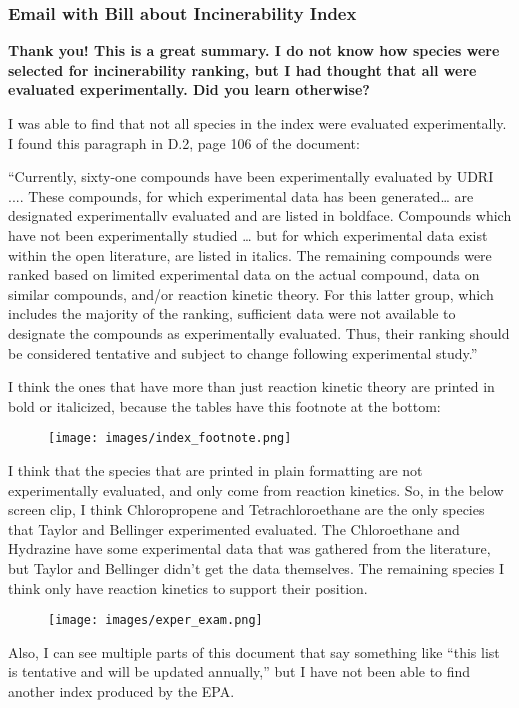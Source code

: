 \documentclass{article}
\begin{document}
\subsubsection*{Email with Bill about Incinerability Index}
\textbf{Thank you! This is a great summary.  I do not know how species were selected for incinerability ranking, but I had thought that all were evaluated experimentally.  Did you learn otherwise?}

I was able to find that not all species in the index were evaluated experimentally. I found this paragraph in D.2, page 106 of the document: 

“Currently, sixty-one compounds have been experimentally evaluated by UDRI .... These compounds, for which experimental data has been generated… are designated experimentallv evaluated and are listed in boldface. Compounds which have not been experimentally studied … but for which experimental data exist within the open literature, are listed in italics. The remaining compounds were ranked based on limited experimental data on the actual compound, data on similar compounds, and/or reaction kinetic theory. For this latter group, which includes the majority of the ranking, sufficient data were not available to designate the compounds as experimentally evaluated. Thus, their ranking should be considered tentative and subject to change following experimental study.”

I think the ones that have more than just reaction kinetic theory are printed in bold or italicized, because the tables have this footnote at the bottom: 
\begin{figure}[H]
\centering
\texttt{[image: images/index\_footnote.png]}
\end{figure}
 
I think that the species that are printed in plain formatting are not experimentally evaluated, and only come from reaction kinetics. So, in the below screen clip, I think Chloropropene and Tetrachloroethane are the only species that Taylor and Bellinger experimented evaluated. The Chloroethane and Hydrazine have some experimental data that was gathered from the literature, but Taylor and Bellinger didn’t get the data themselves. The remaining species I think only have reaction kinetics to support their position. 
\begin{figure}[H]
    \centering
    \texttt{[image: images/exper\_exam.png]}
    \end{figure}

Also, I can see multiple parts of this document that say something like “this list is tentative and will be updated annually,” but I have not been able to find another index produced by the EPA. 
\end{document}
